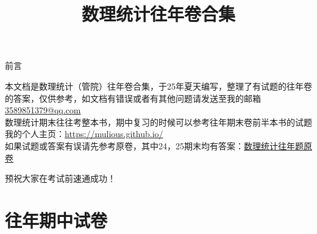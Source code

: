 \documentclass[UTF8,openany]{book}
\title{\Huge 数理统计往年卷合集}
\author{\Large \calligra{NULIOUS}}
\date{}
\begin{document}
	\maketitle
	\frontmatter 
	\begin{center}
		\Huge 前言
	\end{center}
	
	{\Large 本文档是数理统计（管院）往年卷合集，于25年夏天编写，整理了有试题的往年卷的答案，仅供参考，如文档有错误或者有其他问题请发送至我的邮箱\href{mailto:3589851379@qq.com}{3589851379@qq.com}
	\vspace{5mm}\\
	
	数理统计期末往往考整本书，期中复习的时候可以参考往年期末卷前半本书的试题
	\vspace{5mm}\\

	我的个人主页：\url{https://mulious.github.io/}
	\vspace{5mm}\\
	
	如果试题或答案有误请先参考原卷，其中24，25期末均有答案：\href{https://github.com/mulious/USTCexam/tree/main/mathematical-statistics/original-exam}{数理统计往年题原卷}}
	\vspace{1cm}
	\begin{center}
		\huge 预祝大家在考试前速通成功！
	\end{center}
	\tableofcontents 
	\afterpage{\clearpage}
	\mainmatter
	\chapter{\centering 往年期中试卷}
\end{document}
